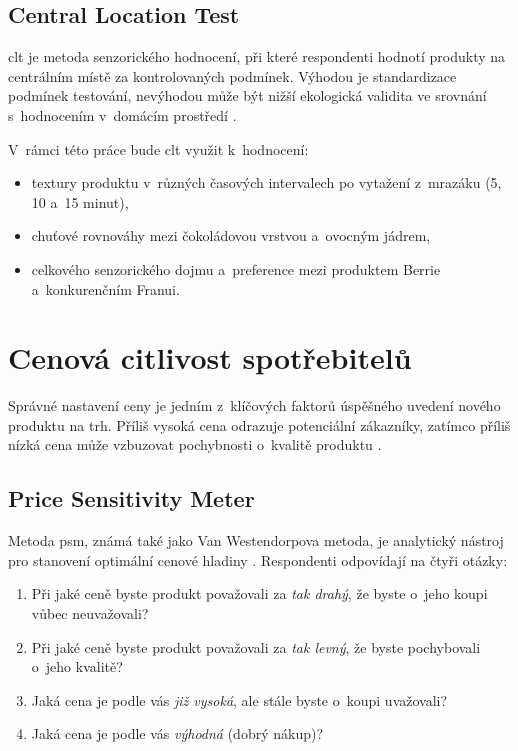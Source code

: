 \subsection{Central Location Test}

\gls{clt} je metoda senzorického hodnocení, při které respondenti hodnotí produkty na centrálním místě za kontrolovaných podmínek. Výhodou je standardizace podmínek testování, nevýhodou může být nižší ekologická validita ve srovnání s~hodnocením v~domácím prostředí \parencite{ruiz_capillas_2021}.

V~rámci této práce bude \gls{clt} využit k~hodnocení:
\begin{itemize}
  \item textury produktu v~různých časových intervalech po vytažení z~mrazáku (5, 10 a~15 minut),
  \item chuťové rovnováhy mezi čokoládovou vrstvou a~ovocným jádrem,
  \item celkového senzorického dojmu a~preference mezi produktem Berrie a~konkurenčním Franui.
\end{itemize}

\section{Cenová citlivost spotřebitelů}
\label{sec:theory_pricing}

Správné nastavení ceny je jedním z~klíčových faktorů úspěšného uvedení nového produktu na trh. Příliš vysoká cena odrazuje potenciální zákazníky, zatímco příliš nízká cena může vzbuzovat pochybnosti o~kvalitě produktu \parencite{kotler_keller_2016}.

\subsection{Price Sensitivity Meter}

Metoda \gls{psm}, známá také jako Van Westendorpova metoda, je analytický nástroj pro stanovení optimální cenové hladiny \parencite{vanwestendorp_1976}. Respondenti odpovídají na čtyři otázky:
\begin{enumerate}
  \item Při jaké ceně byste produkt považovali za \emph{tak drahý}, že byste o~jeho koupi vůbec neuvažovali?
  \item Při jaké ceně byste produkt považovali za \emph{tak levný}, že byste pochybovali o~jeho kvalitě?
  \item Jaká cena je podle vás \emph{již vysoká}, ale stále byste o~koupi uvažovali?
  \item Jaká cena je podle vás \emph{výhodná} (dobrý nákup)?
\end{enumerate}

